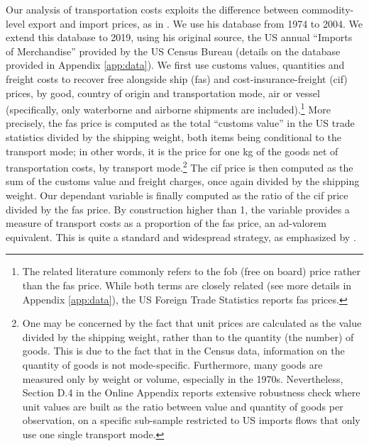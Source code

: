 \documentclass[a4paper,11pt]{article}
\begin{document}
Our analysis of transportation costs exploits the difference between commodity-level export and import prices, as in \cite{hummels2007}. We use his database from 1974 to 2004. We extend this database to 2019, using his original source, the US annual ``Imports of Merchandise'' provided by the US Census Bureau (details on the database provided in Appendix \ref{app:data}). We first use customs values, quantities and freight costs to recover free alongside ship (fas) and cost-insurance-freight (cif) prices, by good, country of origin and transportation mode, air or vessel (specifically, only waterborne and airborne shipments are included).\footnote{The related literature commonly refers to the fob (free on board) price rather than the fas price. While both terms are closely related (see more details in Appendix \ref{app:data}), the US Foreign Trade Statistics reports fas prices.} More precisely, the fas price is computed as the total ``customs value'' in the US trade statistics divided by the shipping weight, both items being conditional to the transport mode; in other words, it is the price for one kg of the goods net of transportation costs, by transport mode.\footnote{One may be concerned by the fact that unit prices are calculated as the value divided by the shipping weight, rather than to the quantity (the number) of goods. This is due to the fact that in the Census data, information on the quantity of goods is not mode-specific. Furthermore, many goods are measured only by weight or volume, especially in the 1970s. Nevertheless, Section D.4 in the Online Appendix reports extensive robustness check where unit values are built as the ratio between value and quantity of goods per observation, on a specific sub-sample restricted to US imports flows that only use one single transport mode.}
The cif price is then computed as the sum of the customs value and freight charges, once again divided by the shipping weight. Our dependant variable is finally computed as the ratio of the cif price divided by the fas price. By construction higher than 1, the variable provides a measure of transport costs as a proportion of the fas price, an ad-valorem equivalent. This is quite a standard and widespread strategy, as emphasized by \cite{anderson_wincoop_jel}.
\end{document}
